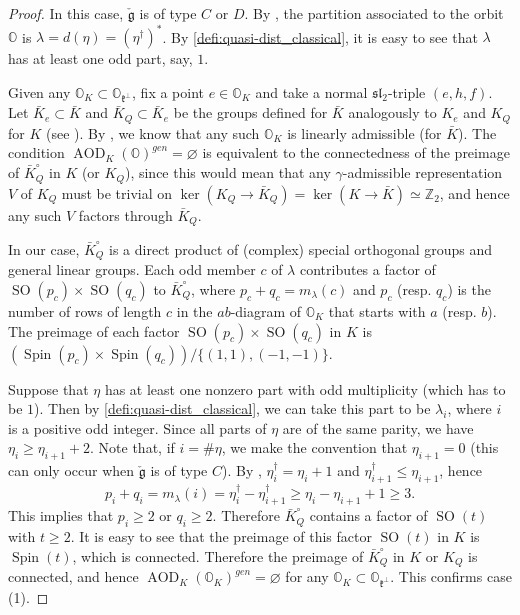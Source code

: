 \documentclass[11pt, a4paper]{amsart}
\newcommand{\orb}{\mathbb{O}}
\newcommand{\orbk}{\orb_{K}}
\newcommand{\Z}{\mathbb{Z}}
\newcommand{\fg}{\mathfrak{g}}
\newcommand{\fk}{\mathfrak{k}}
\newcommand{\ckfg}{{\check{\fg}}}
\DeclareMathOperator{\AOD}{AOD}
\newcommand{\AODK}{\AOD_K}
\newcommand{\SO}{\operatorname{SO}}
\newcommand{\Spin}{\operatorname{Spin}}
\newcommand{\slf}{\mathfrak{sl}}
\newcommand{\GL}{\operatorname{GL}}
\theoremstyle{definition}
\numberwithin{equation}{section}
\begin{document}
\begin{proof}
	In this case, $\ckfg$ is of type $C$ or $D$. By , the partition associated to the orbit $\orb$ is $\lambda = d(\eta) = (\eta^\dagger)^*$. By \cref{defi:quasi-dist_classical}, it is easy to see that $\lambda$ has at least one odd part, say, $1$. 
	
	Given any $\orbk \subset \orb_{\fk^\perp}$, fix a point $e \in \orbk$ and take a normal $\slf_2$-triple $(e, h, f)$. Let $\bar{K}_e \subset \bar{K}$ and $\bar{K}_Q \subset \bar{K}_e$ be the groups defined for $\bar{K}$ analogously to $K_e$ and $K_Q$ for $K$ (see ). By , we know that any such $\orbk$ is linearly admissible (for $\bar{K}$). The condition $\AODK(\orb)^{gen} = \varnothing$ is equivalent to the connectedness of the preimage of $\bar{K}_Q^\circ$ in $K$ (or $K_Q$), since this would mean that any $\gamma$-admissible representation $V$ of $K_Q$ must be trivial on $\ker(K_Q \to \bar{K}_Q) = \ker(K \to \bar{K})\simeq \Z_2$, and hence any such $V$ factors through $\bar{K}_Q$. 
	
	In our case, $\bar{K}_Q^\circ$ is a direct product of (complex) special orthogonal groups and general linear groups. Each odd member $c$ of $\lambda$ contributes a factor of $\SO(p_c) \times \SO(q_c)$ to $\bar{K}_Q^\circ$, where $p_c + q_c = m_\lambda(c)$ and $p_c$ (resp. $q_c$) is the number of rows of length $c$ in the $ab$-diagram of $\orbk$ that starts with $a$ (resp. $b$). 
	The preimage of each factor $\SO(p_c) \times \SO(q_c)$ in $K$ is $(\Spin(p_c) \times \Spin(q_c))/\{(1,1), (-1,-1)\}$.


	Suppose that $\eta$ has at least one nonzero part with odd multiplicity (which has to be $1$). Then by \cref{defi:quasi-dist_classical}, we can take this part to be $\lambda_i$, where $i$ is a positive odd integer. Since all parts of $\eta$ are of the same parity, we have $\eta_i \geqslant \eta_{i+1}+2$. Note that, if $i = \#\eta$, we make the convention that $\eta_{i+1}=0$ (this can only occur when $\ckfg$ is of type $C$). By , $\eta^\dagger_i = \eta_i+1$ and $\eta^\dagger_{i+1} \leqslant \eta_{i+1}$, hence 
		\[ p_i + q_i = m_\lambda(i) = \eta^\dagger_i - \eta^\dagger_{i+1} \geqslant \eta_i - \eta_{i+1} + 1 \geqslant 3. \]
	This implies that $p_i \geqslant 2$ or $q_i \geqslant 2$. Therefore $\bar{K}_Q^\circ$ contains a factor of $\SO(t)$ with $t \geqslant 2$. It is easy to see that the preimage of this factor $\SO(t)$ in $K$ is $\Spin(t)$, which is connected. Therefore the preimage of $\bar{K}_Q^\circ$ in $K$ or $K_Q$ is connected, and hence $\AODK(\orbk)^{gen} = \varnothing$ for any $\orbk \subset \orb_{\fk^\perp}$. This confirms case (1).  
	

\end{proof}
\end{document}

